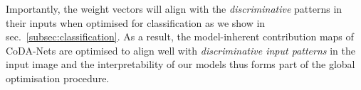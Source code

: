  Importantly, the weight vectors will align with the \emph{discriminative} patterns in their inputs when optimised for classification as we show in sec.~\ref{subsec:classification}.
As a result, the model-inherent contribution maps of CoDA-Nets are optimised to align well with \emph{discriminative input patterns} in the input image 
and the interpretability of our models thus forms part of the global optimisation procedure.